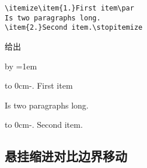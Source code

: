\documentclass{book}
\begin{document}
\begin{example}
\begin{verbatim}
\itemize\item{1.}First item\par
Is two paragraphs long.
\item{2.}Second item.\stopitemize
\end{verbatim}
给出
\begin{disp}
\def\itemize{\begingroup
    \advance\leftskip by \parindent
    \parindent=1em\relax}
\def\stopitemize{\par\endgroup}
\def\item#1{\par\noindent
    \hbox to 0cm{\kern-\parindent #1\hfil}\ignorespaces
    }
\itemize\item{1.}First item\par
Is two paragraphs long.
\item{2.}Second item.\stopitemize
\end{disp}
\end{example}

\subsection{悬挂缩进对比边界移动}
\end{document}
